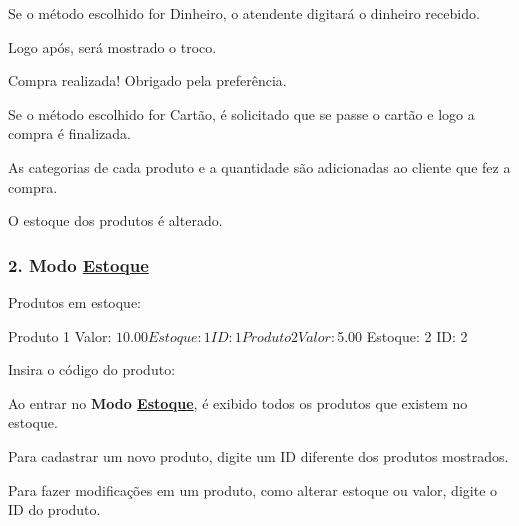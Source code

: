 


\begin{DoxyItemize}
\item Se o método escolhido for Dinheiro, o atendente digitará o dinheiro recebido.
\item Logo após, será mostrado o troco. ~\newline

\end{DoxyItemize}

\begin{DoxyVerb}Compra realizada! Obrigado pela preferência.
\end{DoxyVerb}



\begin{DoxyItemize}
\item Se o método escolhido for Cartão, é solicitado que se passe o cartão e logo a compra é finalizada.
\item As categorias de cada produto e a quantidade são adicionadas ao cliente que fez a compra.
\item O estoque dos produtos é alterado. 


\end{DoxyItemize}

\subsubsection*{2. Modo \hyperlink{class_estoque}{Estoque}}

\begin{DoxyVerb}

    Produtos em estoque:

    Produto 1                     Valor: $10.00               Estoque: 1                   ID: 1
    Produto 2                     Valor: $5.00                Estoque: 2                   ID: 2

Insira o código do produto: 
\end{DoxyVerb}



\begin{DoxyItemize}
\item Ao entrar no {\bfseries Modo \hyperlink{class_estoque}{Estoque}}, é exibido todos os produtos que existem no estoque.
\item Para cadastrar um novo produto, digite um ID diferente dos produtos mostrados.
\item Para fazer modificações em um produto, como alterar estoque ou valor, digite o ID do produto. ~\newline

\end{DoxyItemize}

